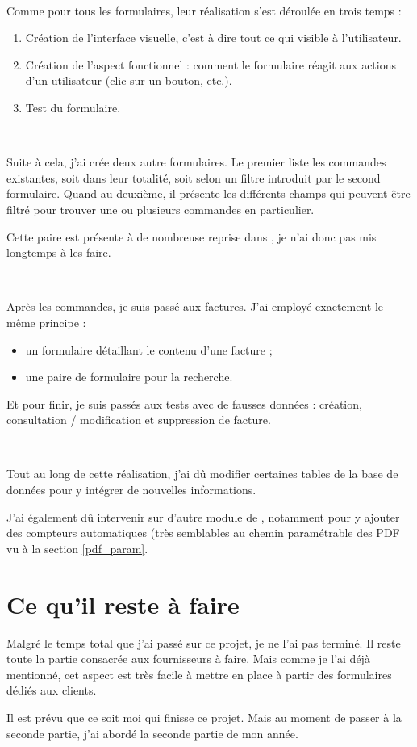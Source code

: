~

Comme pour tous les formulaires, leur réalisation s'est déroulée en trois temps :
\begin{enumerate}
	\item Création de l'interface visuelle, c'est à dire tout ce qui visible à l'utilisateur.
	\item Création de l'aspect fonctionnel : comment le formulaire réagit aux actions d'un utilisateur (clic sur un bouton, etc.).
	\item Test du formulaire.
\end{enumerate}

~

Suite à cela, j'ai crée deux autre formulaires. Le premier liste les commandes existantes, soit dans leur totalité, soit selon un filtre introduit par le second formulaire. Quand au deuxième, il présente les différents champs qui peuvent être filtré pour trouver une ou plusieurs commandes en particulier.

Cette paire est présente à de nombreuse reprise dans \integrale, je n'ai donc pas mis longtemps à les faire.

~

Après les commandes, je suis passé aux factures. J'ai employé exactement le même principe :
\begin{itemize}
	\item un formulaire détaillant le contenu d'une facture ;
	\item une paire de formulaire pour la recherche.
\end{itemize}

Et pour finir, je suis passés aux tests avec de fausses données : création, consultation / modification et suppression de facture.

~

Tout au long de cette réalisation, j'ai dû modifier certaines tables de la base de données pour y intégrer de nouvelles informations.

J'ai également dû intervenir sur d'autre module de \integrale, notamment pour y ajouter des compteurs automatiques (très semblables au chemin paramétrable des PDF vu à la section \ref{pdf_param}.

\section{Ce qu'il reste à faire}
Malgré le temps total que j'ai passé sur ce projet, je ne l'ai pas terminé. Il reste toute la partie consacrée aux fournisseurs à faire. Mais comme je l'ai déjà mentionné, cet aspect est très facile à mettre en place à partir des formulaires dédiés aux clients.

Il est prévu que ce soit moi qui finisse ce projet. Mais au moment de passer à la seconde partie, j'ai abordé la seconde partie de mon année.